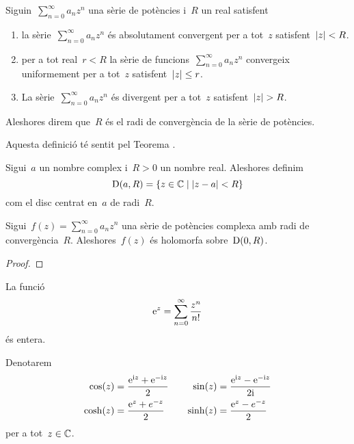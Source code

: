 \documentclass[../Apunts.tex]{subfiles}
\begin{document}
	\begin{definition}[Radi de convergència]
		Siguin~\(\sum_{n=0}^{\infty}a_{n}z^{n}\) una sèrie de potències i~\(R\)
		un real satisfent
		\begin{enumerate}
			\item la sèrie~\(\sum_{n=0}^{\infty}a_{n}z^{n}\) és absolutament
				convergent per a tot~\(z\) satisfent~\(\modul{z}<R\).
			\item per a tot real~\(r<R\) la sèrie de
				funcions~\(\sum_{n=0}^{\infty}a_{n}z^{n}\) convergeix
				uniformement per a tot~\(z\) satisfent~\(\modul{z}\leq r\).
			\item La sèrie~\(\sum_{n=0}^{\infty}a_{n}z^{n}\) és divergent
				per a tot~\(z\) satisfent~\(\modul{z}>R\).
		\end{enumerate}
		Aleshores direm que~\(R\) és el radi de convergència de la sèrie de
		potències.
		
		Aquesta definició té sentit pel Teorema
		.
	\end{definition}
	\begin{definition}[Disc]
		\label{def:disc}
		Sigui~\(a\) un nombre complex i~\(R>0\) un nombre real.
		Aleshores definim
		\[\Disc(a,R)=\{z\in\CC\mid\modul{z-a}<R\}\]
		com el disc centrat en~\(a\) de radi~\(R\).
	\end{definition}
	\begin{proposition}
		Sigui~\(f(z)=\sum_{n=0}^{\infty}a_{n}z^{n}\) una sèrie de potències
		complexa amb radi de convergència~\(R\).
		Aleshores~\(f(z)\) és holomorfa sobre~\(\operatorname{D}(0,R)\).
	\end{proposition}
	\begin{proof}
	\end{proof}
	\begin{example}
		\label{ex:exponencial complexa}
		La funció
		\[\mathrm{e}^{z}=\sum_{n=0}^{\infty}\frac{z^{n}}{n!}\]
		és entera.
	\end{example}
	\begin{notation}
		Denotarem
		\begin{gather*}
			\begin{split}
				\cos(z)&=\frac{\mathrm{e}^{\mathrm{i} z}+\mathrm{e}^{-\mathrm{i} z}}{2} \\
				\cosh(z)&=\frac{\mathrm{e}^{z}+e^{-z}}{2}
			\end{split}\qquad
			\begin{split}
				\sin(z)&=\frac{\mathrm{e}^{\mathrm{i} z}-\mathrm{e}^{-\mathrm{i} z}}{2\mathrm{i}} \\
				\sinh(z)&=\frac{\mathrm{e}^{z}-e^{-z}}{2}
			\end{split} \\
		\end{gather*}
		per a tot~\(z\in\mathbb{C}\).
	\end{notation}
\end{document}
